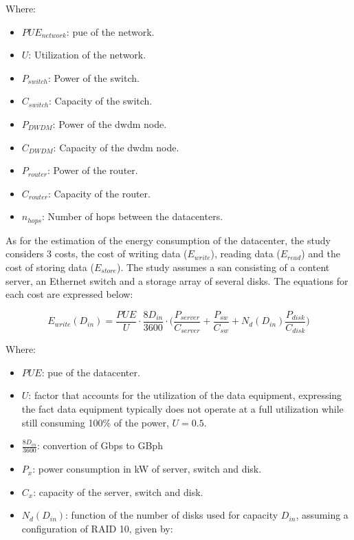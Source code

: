Where:

\begin{itemize}
    \item $PUE_{network}$: \ac{pue} of the network.
    \item $U$: Utilization of the network.
    \item $P_{switch}$: Power of the switch.
    \item $C_{switch}$: Capacity of the switch.
    \item $P_{DWDM}$: Power of the \ac{dwdm} node.
    \item $C_{DWDM}$: Capacity of the \ac{dwdm} node.
    \item $P_{router}$: Power of the router.
    \item $C_{router}$: Capacity of the router.
    \item $n_{hops}$: Number of hops between the datacenters.
\end{itemize}

As for the estimation of the energy consumption of the datacenter, the study considers 3 costs, the cost of writing data ($E_{write}$), reading data ($E_{read}$) and the cost of storing data ($E_{store}$). The study assumes a \ac{san} consisting of a content server, an Ethernet switch and a storage array of several disks. The equations for each cost are expressed below:

\begin{equation}
\label{formula:tall_datacenter_write}
    E_{write}(D_{in}) = \frac{PUE}{U} \cdot \frac{8D_{in}}{3600} \cdot \bigg(\frac{P_{server}}{C_{server}} + \frac{P_{sw}}{C_{sw}} + N_d(D_{in}) \frac{P_{disk}}{C_{disk}}  \bigg) 
\end{equation}

Where:
\begin{itemize}
    \item $PUE$: \ac{pue} of the datacenter.
    \item $U$: factor that accounts for the utilization of the data equipment, expressing the fact data equipment typically does not operate at a full utilization while still consuming 100\% of the power, $U = 0.5$.
    \item $\frac{8D_{in}}{3600}$: convertion of Gbps to GBph
    \item $P_x$: power consumption in kW of server, switch and disk.
    \item $C_x$: capacity of the server, switch and disk.
    \item $N_d(D_{in})$: function of the number of disks used for capacity $D_{in}$, assuming a configuration of RAID 10, given by: 
\end{itemize}


